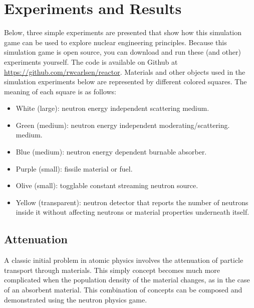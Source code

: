 \documentclass{anstrans}
\begin{document}
\section{Experiments and Results}

Below, three simple experiments are presented that show how this simulation
game can be used to explore nuclear engineering principles.  Because this
simulation game is open source, you can download and run these (and other)
experiments yourself.  The code is available on Github at
\url{https://github.com/rwcarlsen/reactor}.  Materials and other objects used
in the simulation experiments below are represented by different colored
squares.  The meaning of each square is as follows:

\begin{itemize}
        
    \item White (large): neutron energy independent scattering medium.

    \item Green (medium): neutron energy independent moderating/scattering.
        medium.

    \item Blue (medium): neutron energy dependent burnable absorber.

    \item Purple (small): fissile material or fuel.

    \item Olive (small): togglable constant streaming neutron source.

    \item Yellow (transparent): neutron detector that reports the number of
        neutrons inside it without affecting neutrons or material properties
        underneath itself.

\end{itemize}


\subsection{Attenuation}

A classic initial problem in atomic physics involves the attenuation of particle
transport through materials. This simply concept becomes much more complicated
when the population density of the material changes, as in the case of an
absorbent material. This combination of concepts can be composed and
demonstrated using the neutron physics game.
\end{document}
